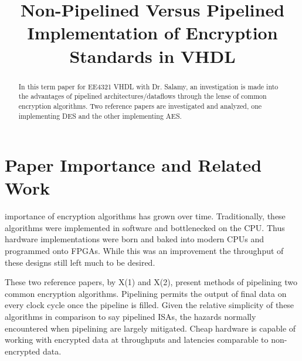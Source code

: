 \documentclass[journal,twocolumn]{IEEEtran}
\begin{document}
\title{Non-Pipelined Versus Pipelined Implementation of Encryption Standards in
VHDL} 
\author{
}

%
{}

\maketitle

\begin{abstract}
In this term paper for EE4321 VHDL with Dr. Salamy, an investigation is made 
into the advantages of pipelined architectures/dataflows through the lense of
common encryption algorithms. Two reference papers are investigated and 
analyzed, one implementing DES and the other implementing AES.
\end{abstract}

\section{Paper Importance and Related Work}
 importance of encryption algorithms has grown over 
time. Traditionally, these algorithms were implemented in software and 
bottlenecked on the CPU. Thus hardware implementations were born and baked 
into modern CPUs and programmed onto FPGAs. While this was an improvement 
the throughput of these designs still left much to be desired.

These two reference papers, by X(1) and X(2), present methods of 
pipelining two common encryption algorithms. Pipelining permits the 
output of final data on every clock cycle once the pipeline is filled. 
Given the relative simplicity of these algorithms in comparison to say 
pipelined ISAs, the hazards normally encountered when pipelining are 
largely mitigated. Cheap hardware is capable of working with encrypted data
at throughputs and latencies comparable to non-encrypted data.
\end{document}
